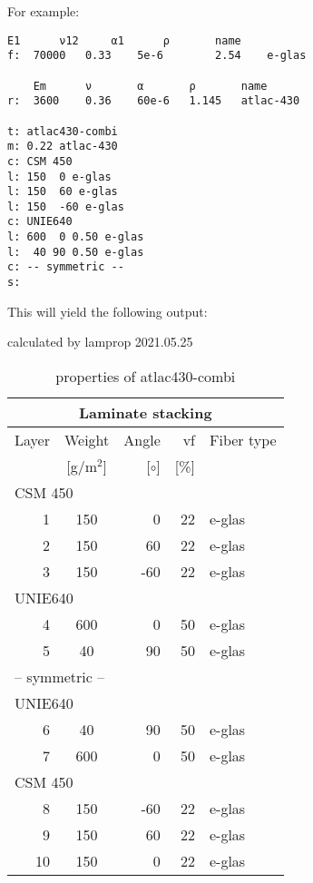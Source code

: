 \documentclass[a4paper,landscape,oneside,11pt,twocolumn]{memoir}
\begin{document}
For example:
\begin{lstlisting}[style=plain]
    E1      ν12     α1      ρ       name
f:  70000   0.33    5e-6        2.54    e-glas

    Em      ν       α       ρ       name
r:  3600    0.36    60e-6   1.145   atlac-430

t: atlac430-combi
m: 0.22 atlac-430
c: CSM 450
l: 150  0 e-glas
l: 150  60 e-glas
l: 150  -60 e-glas
c: UNIE640
l: 600  0 0.50 e-glas
l:  40 90 0.50 e-glas
c: -- symmetric --
s:
\end{lstlisting}

This will yield the following output:

\begin{table}[!htbp]
  \renewcommand{\arraystretch}{1.2}
  \caption{\label{tab:atlac430-combi}properties of atlac430-combi}
  \centering\footnotesize{\rule{0pt}{10pt}
  \tiny calculated by lamprop 2021.05.25\\[3pt]}
    \begin{tabular}[t]{rcrrl}
      \multicolumn{5}{c}{\small\textbf{Laminate stacking}}\\[0.1em]
      \toprule %
      Layer & Weight & Angle & vf & Fiber type\\
            & [g/m$^2$] & [$\circ$] & [\%]\\
      \midrule
\multicolumn{5}{l}{CSM 450}\\
      1 &  150 &     0 & 22 & e-glas\\
      2 &  150 &    60 & 22 & e-glas\\
      3 &  150 &   -60 & 22 & e-glas\\
\multicolumn{5}{l}{UNIE640}\\
      4 &  600 &     0 & 50 & e-glas\\
      5 &   40 &    90 & 50 & e-glas\\
\multicolumn{5}{l}{-- symmetric --}\\
\multicolumn{5}{l}{UNIE640}\\
      6 &   40 &    90 & 50 & e-glas\\
      7 &  600 &     0 & 50 & e-glas\\
\multicolumn{5}{l}{CSM 450}\\
      8 &  150 &   -60 & 22 & e-glas\\
      9 &  150 &    60 & 22 & e-glas\\
      10 &  150 &     0 & 22 & e-glas\\
      \bottomrule
    \end{tabular}\hspace{0.02\textwidth}

\end{table}
\end{document}
